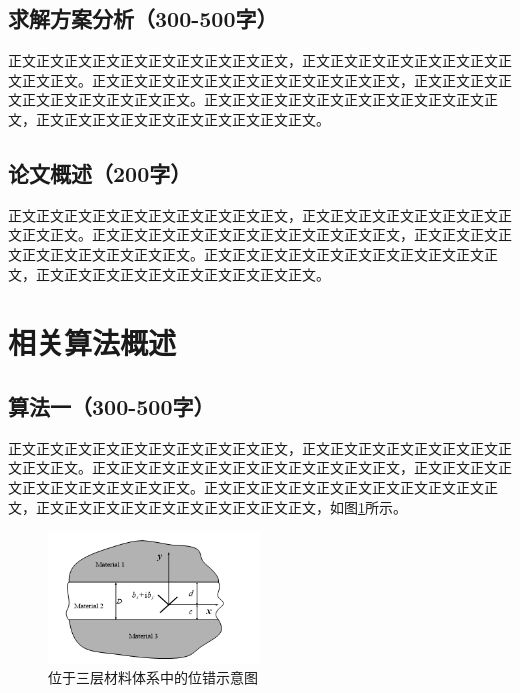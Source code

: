 \documentclass{article}
\begin{document}
\subsection{求解方案分析（300-500字）}
正文正文正文正文正文正文正文正文正文正文，正文正文正文正文正文正文正文正文正文正文。正文正文正文正文正文正文正文正文正文正文正文，正文正文正文正文正文正文正文正文正文正文。正文正文正文正文正文正文正文正文正文正文正文，正文正文正文正文正文正文正文正文正文正文。

\subsection{论文概述（200字）}
正文正文正文正文正文正文正文正文正文正文，正文正文正文正文正文正文正文正文正文正文。正文正文正文正文正文正文正文正文正文正文正文，正文正文正文正文正文正文正文正文正文正文。正文正文正文正文正文正文正文正文正文正文正文，正文正文正文正文正文正文正文正文正文正文。

\section{相关算法概述}
\subsection{算法一（300-500字）}
正文正文正文正文正文正文正文正文正文正文，正文正文正文正文正文正文正文正文正文正文。正文正文正文正文正文正文正文正文正文正文正文，正文正文正文正文正文正文正文正文正文正文。正文正文正文正文正文正文正文正文正文正文正文，正文正文正文正文正文正文正文正文正文正文，如图\ref{fig:sample}所示。

\begin{figure}[H]               
	\centering
	\includegraphics[width=0.5\textwidth]{sample.png}
	\caption{位于三层材料体系中的位错示意图}
	\label{fig:sample}
\end{figure}
\end{document}
